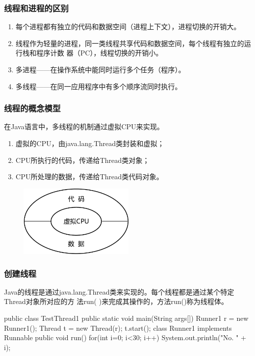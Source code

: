 \documentclass[compress,table]{beamer} %
\begin{document}
\begin{frame}[fragile] %
\frametitle{线程和进程的区别}
\begin{enumerate}
\item 每个进程都有独立的代码和数据空间（进程上下文），进程切换的开销大。
\item 线程作为轻量的进程，同一类线程共享代码和数据空间，每个线程有独立的运行栈和程序计数
  器（PC），线程切换的开销小。
\item 多进程——在操作系统中能同时运行多个任务（程序）。
\item 多线程——在同一应用程序中有多个顺序流同时执行。
\end{enumerate}
\end{frame}

\begin{frame}[fragile] %
\frametitle{线程的概念模型}
在Java语言中，多线程的机制通过虚拟CPU来实现。
\begin{enumerate}
\item 虚拟的CPU，由java.lang.Thread类封装和虚拟；
\item CPU所执行的代码，传递给Thread类对象；
\item CPU所处理的数据，传递给Thread类代码对象。
\end{enumerate}
\begin{figure}
\centering
\includegraphics[width=0.5\textwidth]{fig01.pdf}
\end{figure}
\end{frame}

\begin{frame}[fragile] %
\frametitle{创建线程}

Java的线程是通过java.lang.Thread类来实现的。每个线程都是通过某个特定Thread对象所对应的方
法run( )来完成其操作的，方法run()称为线程体。

\begin{javaCode}
public class TestThread1 {
  public static void main(String args[]) {
    Runner1 r = new Runner1();
    Thread t = new Thread(r);
    t.start();
  }
}
class Runner1 implements Runnable {
  public void run() {
    for(int i=0; i<30; i++) {
      System.out.println("No. " + i);
    }
  }
}
\end{javaCode}
\end{frame}
\end{document}
